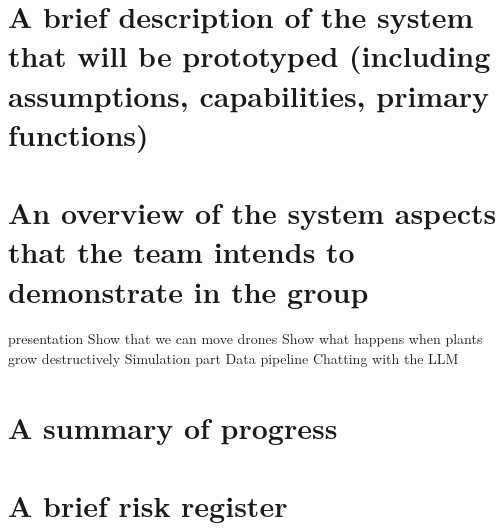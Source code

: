 \documentclass{article}
\begin{document}
\section{A brief description of the system that will be prototyped (including assumptions, capabilities, primary functions)}




\section{An overview of the system aspects that the team intends to demonstrate in the group}
presentation
    Show that we can move drones
    Show what happens when plants grow destructively
        Simulation part
        Data pipeline 
    Chatting with the LLM


\section{A summary of progress}


\section{A brief risk register}
\end{document}

